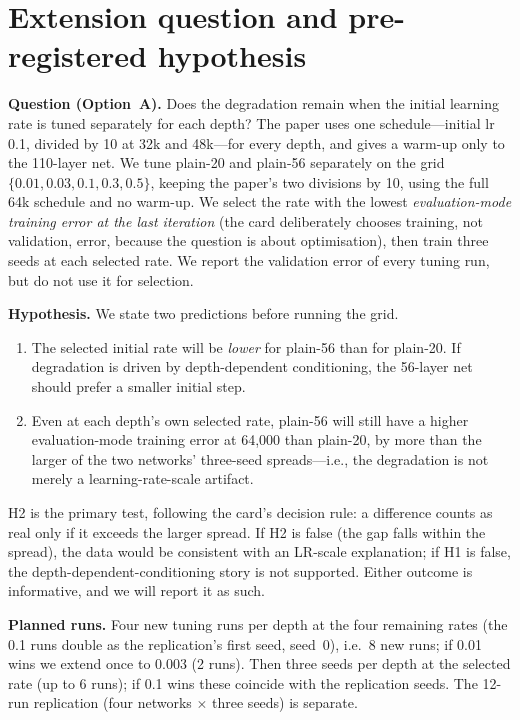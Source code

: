 \documentclass[11pt,a4paper]{article}
\begin{document}
\section{Extension question and pre-registered hypothesis}

\textbf{Question (Option~A).} Does the degradation remain when the initial learning rate is tuned separately for each depth? The paper uses one schedule---initial lr 0.1, divided by 10 at 32k and 48k---for every depth, and gives a warm-up only to the 110-layer net. We tune plain-20 and plain-56 separately on the grid $\{0.01, 0.03, 0.1, 0.3, 0.5\}$, keeping the paper's two divisions by 10, using the full 64k schedule and no warm-up. We select the rate with the lowest \emph{evaluation-mode training error at the last iteration} (the card deliberately chooses training, not validation, error, because the question is about optimisation), then train three seeds at each selected rate. We report the validation error of every tuning run, but do not use it for selection.

\textbf{Hypothesis.} We state two predictions before running the grid.
\begin{enumerate}
\item[(H1)] The selected initial rate will be \emph{lower} for plain-56 than for plain-20. If degradation is driven by depth-dependent conditioning, the 56-layer net should prefer a smaller initial step.
\item[(H2)] Even at each depth's own selected rate, plain-56 will still have a higher evaluation-mode training error at 64{,}000 than plain-20, by more than the larger of the two networks' three-seed spreads---i.e., the degradation is not merely a learning-rate-scale artifact.
\end{enumerate}
H2 is the primary test, following the card's decision rule: a difference counts as real only if it exceeds the larger spread. If H2 is false (the gap falls within the spread), the data would be consistent with an LR-scale explanation; if H1 is false, the depth-dependent-conditioning story is not supported. Either outcome is informative, and we will report it as such.

\textbf{Planned runs.} Four new tuning runs per depth at the four remaining rates (the 0.1 runs double as the replication's first seed, seed~0), i.e.\ 8 new runs; if 0.01 wins we extend once to 0.003 (2 runs). Then three seeds per depth at the selected rate (up to 6 runs); if 0.1 wins these coincide with the replication seeds. The 12-run replication (four networks $\times$ three seeds) is separate.
\end{document}
